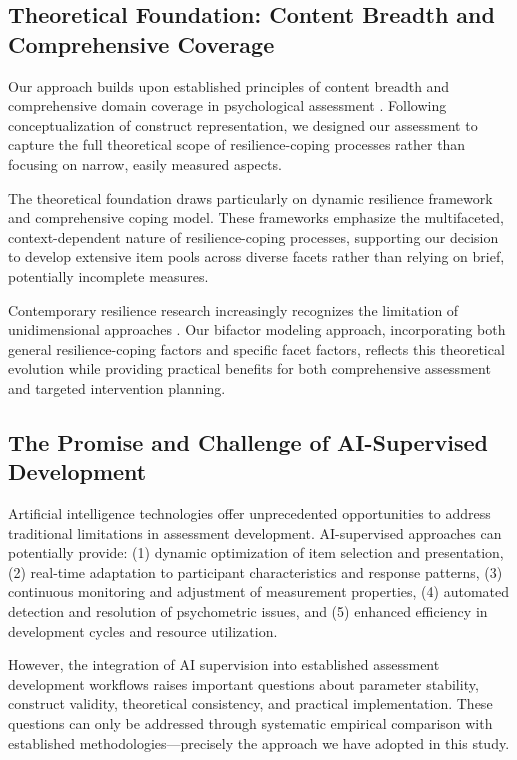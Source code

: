 \documentclass[12pt,a4paper]{article}
\begin{document}
\subsection{Theoretical Foundation: Content Breadth and Comprehensive Coverage}

Our approach builds upon established principles of content breadth and comprehensive domain coverage in psychological assessment \cite{Messick1995, Clark1995}. Following \cite{Cronbach1971} conceptualization of construct representation, we designed our assessment to capture the full theoretical scope of resilience-coping processes rather than focusing on narrow, easily measured aspects.

The theoretical foundation draws particularly on \cite{Bonanno2004} dynamic resilience framework and \cite{Folkman2000} comprehensive coping model. These frameworks emphasize the multifaceted, context-dependent nature of resilience-coping processes, supporting our decision to develop extensive item pools across diverse facets rather than relying on brief, potentially incomplete measures.

Contemporary resilience research increasingly recognizes the limitation of unidimensional approaches \cite{Southwick2014}. Our bifactor modeling approach, incorporating both general resilience-coping factors and specific facet factors, reflects this theoretical evolution while providing practical benefits for both comprehensive assessment and targeted intervention planning.

\subsection{The Promise and Challenge of AI-Supervised Development}

Artificial intelligence technologies offer unprecedented opportunities to address traditional limitations in assessment development. AI-supervised approaches can potentially provide: (1) dynamic optimization of item selection and presentation, (2) real-time adaptation to participant characteristics and response patterns, (3) continuous monitoring and adjustment of measurement properties, (4) automated detection and resolution of psychometric issues, and (5) enhanced efficiency in development cycles and resource utilization.

However, the integration of AI supervision into established assessment development workflows raises important questions about parameter stability, construct validity, theoretical consistency, and practical implementation. These questions can only be addressed through systematic empirical comparison with established methodologies—precisely the approach we have adopted in this study.
\end{document}
